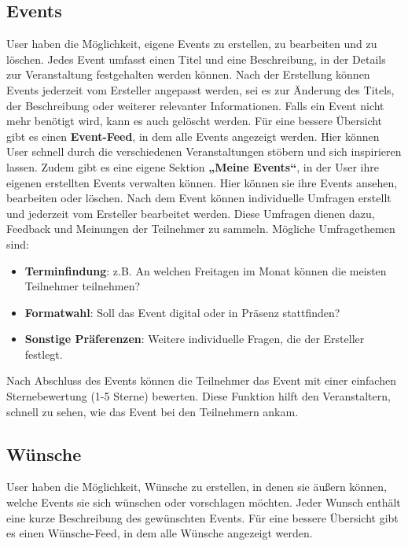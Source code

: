 \documentclass[a4paper,12pt]{article}
\begin{document}
\subsection{Events}
User haben die Möglichkeit, eigene Events zu erstellen, zu bearbeiten und zu löschen. Jedes Event umfasst einen Titel und eine Beschreibung, in der Details zur Veranstaltung festgehalten werden können. Nach der Erstellung können Events jederzeit vom Ersteller angepasst werden, sei es zur Änderung des Titels, der Beschreibung oder weiterer relevanter Informationen. Falls ein Event nicht mehr benötigt wird, kann es auch gelöscht werden. Für eine bessere Übersicht gibt es einen \textbf{Event-Feed}, in dem alle Events angezeigt werden. Hier können User schnell durch die verschiedenen Veranstaltungen stöbern und sich inspirieren lassen. Zudem gibt es eine eigene Sektion \textbf{„Meine Events“}, in der User ihre eigenen erstellten Events verwalten können. Hier können sie ihre Events ansehen, bearbeiten oder löschen. Nach dem Event können individuelle Umfragen erstellt und jederzeit vom Ersteller bearbeitet werden. Diese Umfragen dienen dazu, Feedback und Meinungen der Teilnehmer zu sammeln. Mögliche Umfragethemen sind:
\begin{itemize}
    \item \textbf{Terminfindung}: z.B. An welchen Freitagen im Monat können die meisten Teilnehmer teilnehmen?
    \item \textbf{Formatwahl}: Soll das Event digital oder in Präsenz stattfinden?
    \item \textbf{Sonstige Präferenzen}: Weitere individuelle Fragen, die der Ersteller festlegt.
\end{itemize}
Nach Abschluss des Events können die Teilnehmer das Event mit einer einfachen Sternebewertung (1-5 Sterne) bewerten. Diese Funktion hilft den Veranstaltern, schnell zu sehen, wie das Event bei den Teilnehmern ankam.

\newpage


\subsection{Wünsche}
User haben die Möglichkeit, Wünsche zu erstellen, in denen sie äußern können, welche Events sie sich wünschen oder vorschlagen möchten. Jeder Wunsch enthält eine kurze Beschreibung des gewünschten Events. Für eine bessere Übersicht gibt es einen Wünsche-Feed, in dem alle Wünsche angezeigt werden.
\end{document}
